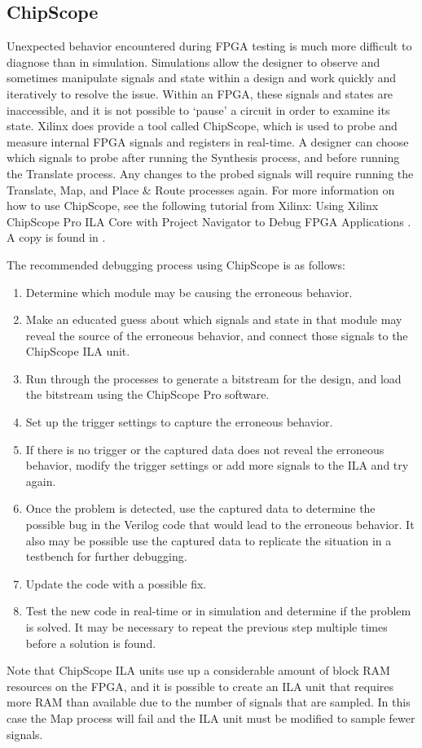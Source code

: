 \subsection{ChipScope}
Unexpected behavior encountered during FPGA testing is much more difficult to diagnose than in simulation. Simulations allow the designer to observe and sometimes manipulate signals and state within a design and work quickly and iteratively to resolve the issue. Within an FPGA, these signals and states are inaccessible, and it is not possible to `pause' a circuit in order to examine its state. Xilinx does provide a tool called ChipScope, which is used to probe and measure internal FPGA signals and registers in real-time. A designer can choose which signals to probe after running the Synthesis process, and before running the Translate process. Any changes to the probed signals will require running the Translate, Map, and Place \& Route processes again. For more information on how to use ChipScope, see the following tutorial from Xilinx: Using Xilinx ChipScope Pro ILA Core with Project Navigator to Debug FPGA Applications \cite{chipscope-pro-tutorial}. A copy is found in .

The recommended debugging process using ChipScope is as follows:

\begin{enumerate}
	\item Determine which module may be causing the erroneous behavior.
	\item Make an educated guess about which signals and state in that module may reveal the source of the erroneous behavior, and connect those signals to the ChipScope ILA unit.
	\item Run through the processes to generate a bitstream for the design, and load the bitstream using the ChipScope Pro software.
	\item Set up the trigger settings to capture the erroneous behavior.
	\item If there is no trigger or the captured data does not reveal the erroneous behavior, modify the trigger settings or add more signals to the ILA and try again.
	\item Once the problem is detected, use the captured data to determine the possible bug in the Verilog code that would lead to the erroneous behavior. It also may be possible use the captured data to replicate the situation in a testbench for further debugging.
	\item Update the code with a possible fix.
	\item Test the new code in real-time or in simulation and determine if the problem is solved. It may be necessary to repeat the previous step multiple times before a solution is found.
\end{enumerate}

Note that ChipScope ILA units use up a considerable amount of block RAM resources  on the FPGA, and it is possible to create an ILA unit that requires more RAM than available due to the number of signals that are sampled. In this case the Map process will fail and the ILA unit must be modified to sample fewer signals.